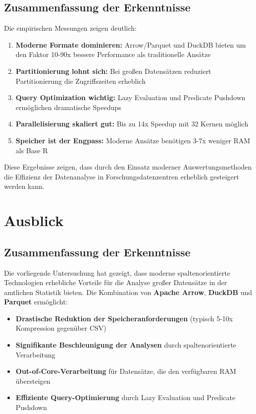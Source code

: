 \documentclass[
  ngerman,
  10pt,
  letterpaper,
  twocolumn]{book}
\providecommand{\tightlist}{%
  \setlength{\itemsep}{0pt}\setlength{\parskip}{0pt}}
\begin{document}
\section{Zusammenfassung der
Erkenntnisse}\label{zusammenfassung-der-erkenntnisse}

Die empirischen Messungen zeigen deutlich:

\begin{enumerate}
\def\labelenumi{\arabic{enumi}.}
\item
  \textbf{Moderne Formate dominieren:} Arrow/Parquet und DuckDB bieten
  um den Faktor 10-90x bessere Performance als traditionelle Ansätze
\item
  \textbf{Partitionierung lohnt sich:} Bei großen Datensätzen reduziert
  Partitionierung die Zugriffszeiten erheblich
\item
  \textbf{Query Optimization wichtig:} Lazy Evaluation und Predicate
  Pushdown ermöglichen dramatische Speedups
\item
  \textbf{Parallelisierung skaliert gut:} Bis zu 14x Speedup mit 32
  Kernen möglich
\item
  \textbf{Speicher ist der Engpass:} Moderne Ansätze benötigen 3-7x
  weniger RAM als Base R
\end{enumerate}

Diese Ergebnisse zeigen, dass durch den Einsatz moderner
Auswertungsmethoden die Effizienz der Datenanalyse in
Forschungsdatenzentren erheblich gesteigert werden kann.


\chapter{Ausblick}\label{sec-ausblick}

\section{Zusammenfassung der
Erkenntnisse}\label{zusammenfassung-der-erkenntnisse-1}

Die vorliegende Untersuchung hat gezeigt, dass moderne
spaltenorientierte Technologien erhebliche Vorteile für die Analyse
großer Datensätze in der amtlichen Statistik bieten. Die Kombination von
\textbf{Apache Arrow}, \textbf{DuckDB} und \textbf{Parquet} ermöglicht:

\begin{itemize}
\tightlist
\item
  \textbf{Drastische Reduktion der Speicheranforderungen} (typisch 5-10x
  Kompression gegenüber CSV)
\item
  \textbf{Signifikante Beschleunigung der Analysen} durch
  spaltenorientierte Verarbeitung
\item
  \textbf{Out-of-Core-Verarbeitung} für Datensätze, die den verfügbaren
  RAM übersteigen
\item
  \textbf{Effiziente Query-Optimierung} durch Lazy Evaluation und
  Predicate Pushdown
\end{itemize}
\end{document}
